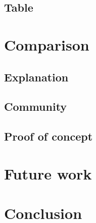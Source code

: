 \documentclass[a4paper]{article}
\begin{document}
\subsection{Table}
\label{sec:table} 

\section{Comparison} %
\label{sec:comparison}

\subsection{Explanation} %
\label{sec:explanation}

\subsection{Community} %
\label{sec:community}

\subsection{Proof of concept} %
\label{sec:poc}

\section{Future work} %
\label{sec:future_work}

\section{Conclusion} %
\label{sec:conclusion}



\end{document}
